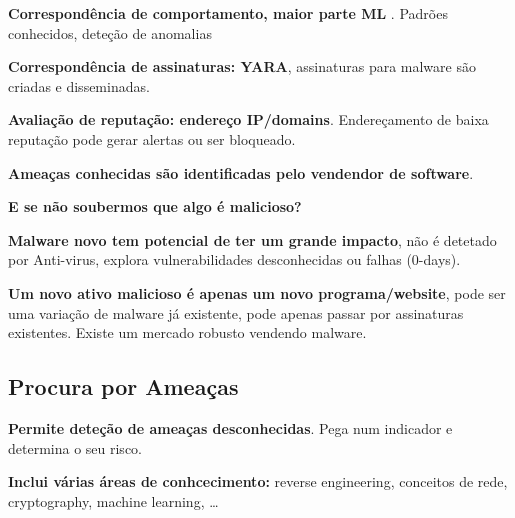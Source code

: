 \documentclass{article}
\begin{document}
\begin{flushleft}
  \textbf{Correspondência de comportamento, maior parte ML }. Padrões conhecidos,
  deteção de anomalias

  \vspace{2mm}

  \textbf{Correspondência de assinaturas: YARA}, assinaturas para malware são
  criadas e disseminadas.

  \vspace{2mm}

  \textbf{Avaliação de reputação: endereço IP/domains}. Endereçamento de baixa reputação
  pode gerar alertas ou ser bloqueado.

  \vspace{2mm}

  \textbf{Ameaças conhecidas são identificadas pelo vendendor de software}.

  \vspace{2mm}

  \textbf{E se não soubermos que algo é malicioso?}

  \vspace{2mm}

  \textbf{Malware novo tem potencial de ter um grande impacto}, não é detetado
  por Anti-virus, explora vulnerabilidades desconhecidas ou falhas (0-days).

  \vspace{2mm}

  \textbf{Um novo ativo malicioso é apenas um novo programa/website}, pode ser
  uma variação de malware já existente, pode apenas passar por assinaturas
  existentes. Existe um mercado robusto vendendo malware.
\end{flushleft}

\subsection{Procura por Ameaças}

\begin{flushleft}
  \begin{flushleft}
    \textbf{Permite deteção de ameaças desconhecidas}. Pega num indicador
    e determina o seu risco.

    \vspace{2mm}

    \textbf{Inclui várias áreas de conhcecimento:} reverse engineering,
    conceitos de rede, cryptography, machine learning, \dots
  \end{flushleft}
\end{flushleft}
\end{document}
